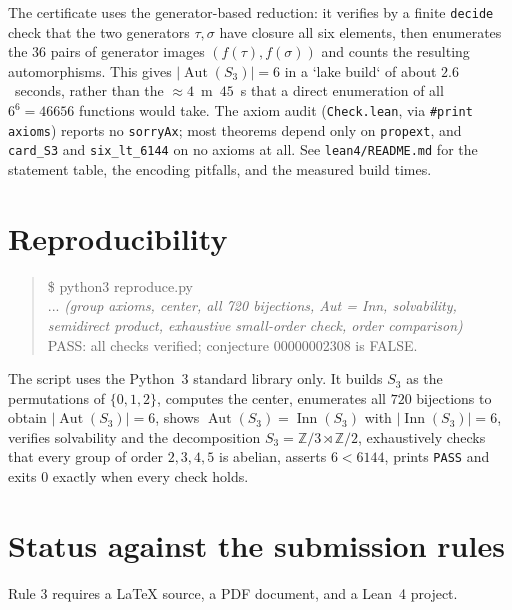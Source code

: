 \documentclass[11pt]{article}
\theoremstyle{definition}
\theoremstyle{remark}
\newcommand{\Aut}{\operatorname{Aut}}
\newcommand{\Inn}{\operatorname{Inn}}
\newcommand{\Z}{\mathbb{Z}}
\newcommand{\Zc}[1]{\Z/#1}
\newcommand{\Sthree}{S_3}
\begin{document}
The certificate uses the generator-based reduction: it verifies by a finite
\texttt{decide} check that the two generators $\tau,\sigma$ have closure all six
elements, then enumerates the $36$ pairs of generator images $(f(\tau),f(\sigma))$
and counts the resulting automorphisms. This gives $|\Aut(\Sthree)| = 6$ in a
`lake build` of about $2.6$~seconds, rather than the $\approx 4$~m~$45$~s that a
direct enumeration of all $6^6 = 46656$ functions would take. The axiom audit
(\texttt{Check.lean}, via \texttt{\#print axioms}) reports no \texttt{sorryAx};
most theorems depend only on \texttt{propext}, and \texttt{card\_S3} and
\texttt{six\_lt\_6144} on no axioms at all. See \texttt{lean4/README.md} for the
statement table, the encoding pitfalls, and the measured build times.

\section{Reproducibility}

\begin{quote}\ttfamily
\$ python3 reproduce.py\\
... \textit{(group axioms, center, all 720 bijections, Aut = Inn, solvability,
semidirect product, exhaustive small-order check, order comparison)}\\
PASS: all checks verified; conjecture 00000002308 is FALSE.
\end{quote}

The script uses the Python~3 standard library only. It builds $\Sthree$ as the
permutations of $\{0,1,2\}$, computes the center, enumerates all $720$
bijections to obtain $|\Aut(\Sthree)| = 6$, shows
$\Aut(\Sthree) = \Inn(\Sthree)$ with $|\Inn(\Sthree)| = 6$, verifies solvability
and the decomposition $\Sthree = \Zc{3} \rtimes \Zc{2}$, exhaustively checks
that every group of order $2,3,4,5$ is abelian, asserts $6 < 6144$, prints
\texttt{PASS} and exits $0$ exactly when every check holds.

\section*{Status against the submission rules}

Rule 3 requires a LaTeX source, a PDF document, and a Lean~4 project.
\end{document}

